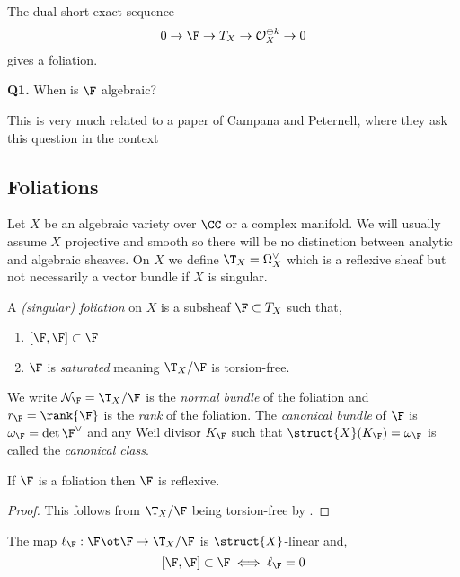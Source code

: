 \documentclass[12pt]{article}
\begin{document}
\begin{lemma}
The dual short exact sequence
\[ 0 \rightarrow \F \rightarrow T_{X} \rightarrow \cO_{X}^{\oplus k} \rightarrow 0 \]
gives a foliation.
\end{lemma}

\textbf{Q1.} When is $\F$ algebraic?

This is very much related to a paper of Campana and Peternell, where they ask this question in the context

\subsection{Foliations}

Let $X$ be an algebraic variety over $\CC$ or a complex manifold. We will usually assume $X$ projective and smooth so there will be no distinction between analytic and algebraic sheaves. On $X$ we define $\T_X = \Omega_X^\vee$ which is a reflexive sheaf but not necessarily a vector bundle if $X$ is singular. 

\begin{defn}
A \textit{(singular) foliation} on $X$ is a subsheaf $\F \subset T_X$ such that,
\begin{enumerate}
\item $[\F, \F] \subset \F$ 

\item $\F$ is \textit{saturated} meaning $\T_X / \F$ is torsion-free.
\end{enumerate}
We write $\cN_{\F} = \T_X / \F$ is the \textit{normal bundle} of the foliation and $r_\F = \rank{\F}$ is the \textit{rank} of the foliation. The \textit{canonical bundle} of $\F$ is $\omega_{\F} = \det{\F}^\vee$ and any Weil divisor $K_{\F}$ such that $\struct{X}(K_\F) = \omega_{\F}$ is called the \textit{canonical class}. 
\end{defn}

\begin{prop}
If $\F$ is a foliation then $\F$ is reflexive.
\end{prop}

\begin{proof}
This follows from $\T_X / \F$ being torsion-free by .
\end{proof}

\begin{prop}
The map $\ell_\F : \F \ot \F \to \T_X / \F$ is $\struct{X}$-linear and,
\[ [\F, \F] \subset \F \iff \ell_\F = 0 \]
\end{prop}
\end{document}
